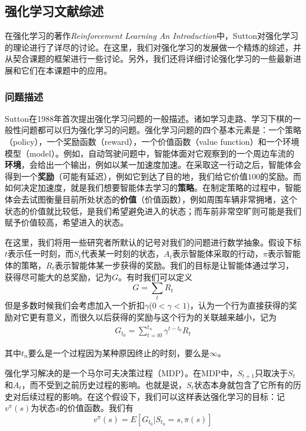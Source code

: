 \documentclass[degree=bachelor, tocarialchapter, pifootnote]{thuthesis}
\begin{document}
  \subsection{强化学习文献综述}
    在强化学习的著作\textit{Reinforcement Learning An Introduction}\cite{Sutton_book}中，Sutton对强化学习的理论进行了详尽的讨论。在这里，我们对强化学习的发展做一个精炼的综述，并从契合课题的框架进行一些讨论。另外，我们还将详细讨论强化学习的一些最新进展和它们在本课题中的应用。
    \subsubsection{问题描述}
      Sutton在1988年首次提出强化学习问题的一般描述\cite{Sutton_problem_formulation}。诸如学习走路、学习下棋的一般性问题都可以归为强化学习的问题。强化学习问题的四个基本元素是：一个策略（policy），一个奖励函数（reward），一个价值函数（value function）和一个环境模型（model）。例如，自动驾驶问题中，智能体面对它观察到的一个周边车流的\textbf{环境}，会给出一个输出，例如以某一加速度加速。在采取这一行动之后，智能体会得到一个\textbf{奖励}（可能有延迟），例如它到达了目的地，我们给它价值$100$的奖励。而如何决定加速度，就是我们想要智能体去学习的\textbf{策略}。在制定策略的过程中，智能体会去试图衡量目前所处状态的\textbf{价值}（价值函数），例如周围车辆非常拥堵，这个状态的价值就比较低，是我们希望避免进入的状态；而车前非常空旷则可能是我们赋予价值较高，希望进入的状态。\par
      在这里，我们将用一些研究者所默认的记号对我们的问题进行数学抽象。假设下标$t$表示任一时刻，而$S_t$代表某一时刻的状态，$A_t$表示智能体采取的行动，$\pi$表示智能体的策略，$R_t$表示智能体某一步获得的奖励。我们的目标是让智能体通过学习，获得尽可能大的总奖励，记为$G$。有时我们可以定义
      $$ G = \sum_{t} R_t $$
      但是多数时候我们会考虑加入一个折扣$\gamma$($0 < \gamma < 1$)，认为一个行为直接获得的奖励对它更有意义，而很久以后获得的奖励与这个行为的关联越来越小，记为
      \begin{align}
        G_{t_0} = \sum_{t = t0}^{t_n} \gamma^{t-t_0} R_t
        \label{eq:G}
      \end{align}
      \par 其中$t_n$要么是一个过程因为某种原因终止的时刻，要么是$\infty$。\par
      强化学习解决的是一个马尔可夫决策过程（MDP）\cite{Bellman_MDP}。在MDP中，$S_{t+1}$只取决于$S_t$和$A_t$，而不受到之前历史过程的影响。也就是说，$S_t$状态本身就包含了它所有的历史对后续过程的影响。在这个假设下，我们可以这样表达强化学习的目标\cite{DRL_for_driving}：记$v^{\pi}(s)$为状态$s$的价值函数。我们有$$ v^{\pi}(s) = E[G_{t_0} | S_{t_0} = s, \pi(s) ] $$
\end{document}

